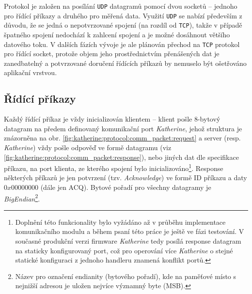 Protokol je založen na posílání \texttt{UDP} datagramů pomocí dvou socketů -- jednoho pro řídící příkazy a druhého pro měřená data. Využití \texttt{UDP} se nabízí především z důvodu, že se jedná o nepotvrzované spojení (na rozdíl od \texttt{TCP}), takže v případě špatného spojení nedochází k zahlcení spojení a je možné dosáhnout většího datového toku. V dalších fázích vývoje je ale plánován přechod na \texttt{TCP} protokol pro řídící socket, protože objem jeho prostřednictvím přenášených dat je zanedbatelný a potvrzované doručení řídících příkazů by nemuselo být ošetřováno aplikační vrstvou.

\subsection{Řídící příkazy}\label{chap:katherine:protocol:control_commands}
Každý řídící příkaz je vždy inicializován klientem -- klient pošle 8-bytový datagram na předem definovaný komunikační port \textit{Katherine}, jehož struktura je znázorněna na obr. \ref{fig:katherine:protocol:comm_packet:request} a server (resp. \textit{Katherine}) vždy pošle odpověď ve formě datagramu (viz \ref{fig:katherine:protocol:comm_packet:response}), nebo jiných dat dle specifikace příkazu, na port klienta, ze kterého spojení bylo inicializováno\footnote{Doplnění této funkcionality bylo vyžádáno až v průběhu implementace komunikačního modulu a během psaní této práce je ještě ve fázi testování. V současné produkční verzi firmware \textit{Katherine} tedy posílá response datagram na staticky konfigurovaný port, což pro operování více \textit{Katherine} o stejné statické konfiguraci z jednoho handleru znamená konflikt portů.}. Response některých příkazů je jen potvrzení (tzv. \textit{Acknowledge}) ve formě ID příkazu a daty $0x00000000$ (dále jen ACQ). Bytové pořadí pro všechny datagramy je \textit{BigEndian}\footnote{Název pro označení endianity (bytového pořadí), kde na paměťové místo s nejnižší adresou je uložen nejvíce významný byte (MSB).}.


